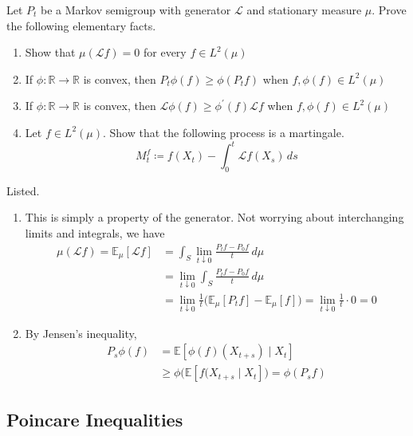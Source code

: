 \documentclass{article}
\begin{document}
\begin{exercise}
Let $P_t$ be a Markov semigroup with generator $\mathscr{L}$ and stationary measure $\mu$. Prove the following elementary facts. 
\begin{enumerate}
    \item Show that $\mu( \mathscr{L} f) = 0$ for every $f \in L^2 (\mu)$ 
    \item If $\phi : \mathbb{R} \rightarrow \mathbb{R}$ is convex, then $P_t \phi (f) \geq \phi (P_t f)$ when $f, \phi(f) \in L^2(\mu)$ 
    \item If $\phi : \mathbb{R} \rightarrow \mathbb{R}$ is convex, then $\mathscr{L} \phi(f) \geq \phi^\prime (f) \mathscr{L} f$ when $f, \phi(f) \in L^2 (\mu)$ 
    \item Let $f \in L^2 (\mu)$. Show that the following process is a martingale. 
    \[M_t^f \coloneqq f(X_t) - \int_0^t \mathscr{L} f(X_s) \,ds\]
\end{enumerate}
\end{exercise}
\begin{solution}
Listed. 
\begin{enumerate}
    \item This is simply a property of the generator. Not worrying about interchanging limits and integrals, we have 
    \begin{align*}
        \mu(\mathscr{L} f) = \mathbb{E}_\mu [\mathscr{L} f] & = \int_S \lim_{t \downarrow 0} \frac{P_t f - P_0 f}{t} \,d\mu \\ 
        & = \lim_{t \downarrow 0} \int_S \frac{P_t f - P_0 f}{t} \,d\mu \\
        & = \lim_{t \downarrow 0} \frac{1}{t} \big( \mathbb{E}_\mu [P_t f] - \mathbb{E}_\mu [f] \big) = \lim_{t \downarrow 0} \frac{1}{t} \cdot 0 = 0 
    \end{align*}
    
    \item By Jensen's inequality, 
    \begin{align*}
        P_s \phi(f) & = \mathbb{E} [ \phi(f) (X_{t + s}) \mid X_t] \\
        & \geq \phi \bigg( \mathbb{E}[f(X_{t + s} \mid X_t] \big) = \phi(P_s f)
    \end{align*}

\end{enumerate}
\end{solution}


\subsection{Poincare Inequalities}
\end{document}
